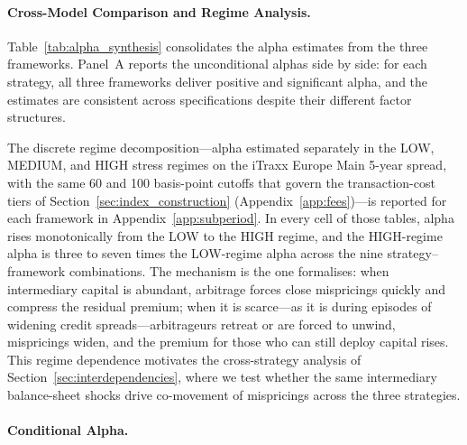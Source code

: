 \paragraph{Cross-Model Comparison and Regime Analysis.}

Table~\ref{tab:alpha_synthesis} consolidates the alpha estimates from
the three frameworks. Panel~A reports the unconditional alphas side by
side: for each strategy, all three frameworks deliver positive and
significant alpha, and the estimates are consistent across
specifications despite their different factor structures.

The discrete regime decomposition---alpha estimated separately in the
LOW, MEDIUM, and HIGH stress regimes on the iTraxx Europe Main 5-year
spread, with the same 60 and 100 basis-point cutoffs that govern the
transaction-cost tiers of Section~\ref{sec:index_construction}
(Appendix~\ref{app:fees})---is reported for each framework in
Appendix~\ref{app:subperiod}. In every cell of those tables, alpha
rises monotonically from the LOW to the HIGH regime, and the
HIGH-regime alpha is three to seven times the LOW-regime alpha across
the nine strategy--framework combinations. The mechanism is the one
\citet{duffie2010presidential} formalises: when intermediary capital
is abundant, arbitrage forces close mispricings quickly and compress
the residual premium; when it is scarce---as it is during episodes of
widening credit spreads---arbitrageurs retreat or are forced to
unwind, mispricings widen, and the premium for those who can still
deploy capital rises. This regime dependence motivates the
cross-strategy analysis of Section~\ref{sec:interdependencies}, where
we test whether the same intermediary balance-sheet shocks drive
co-movement of mispricings across the three strategies.

\paragraph{Conditional Alpha.}

